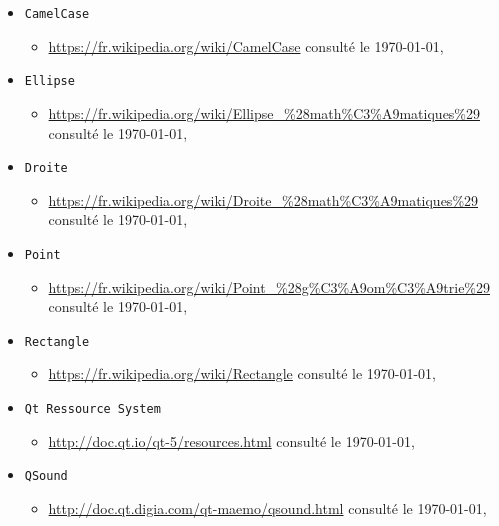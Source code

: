 \documentclass[a4paper,11pt]{report}
\begin{document}
\begin{itemize}
\begin{itemize}
			\item \url{https://fr.wikipedia.org/wiki/Feuilles_de_style_en_cascade} consulté le \today,\\
		\end{itemize}
	\item[] \texttt{CamelCase} 
		\begin{itemize}
			\item \url{https://fr.wikipedia.org/wiki/CamelCase} consulté le \today,\\
		\end{itemize}
	\item[] \texttt{Ellipse}
		\begin{itemize}
			\item \url{https://fr.wikipedia.org/wiki/Ellipse_\%28math\%C3\%A9matiques\%29} consulté le \today,\\
		\end{itemize}
	\item[] \texttt{Droite}
		\begin{itemize}
			\item \url{https://fr.wikipedia.org/wiki/Droite_\%28math\%C3\%A9matiques\%29} consulté le \today,\\
		\end{itemize}
	\item[] \texttt{Point}
		\begin{itemize}
			\item \url{https://fr.wikipedia.org/wiki/Point_\%28g\%C3\%A9om\%C3\%A9trie\%29}
				consulté le \today,\\
		\end{itemize}
	\item[] \texttt{Rectangle}
		\begin{itemize}
			\item \url{https://fr.wikipedia.org/wiki/Rectangle} consulté le
				\today, \\
		\end{itemize}
	\item[]  \texttt{Qt Ressource System}
		\begin{itemize}
			\item \url{http://doc.qt.io/qt-5/resources.html} consulté le
				\today,\\
		\end{itemize}
	\item[] \texttt{QSound}
		\begin{itemize}
			\item \url{http://doc.qt.digia.com/qt-maemo/qsound.html} consulté le
				\today,\\

\end{itemize}
\end{itemize}
\end{document}
